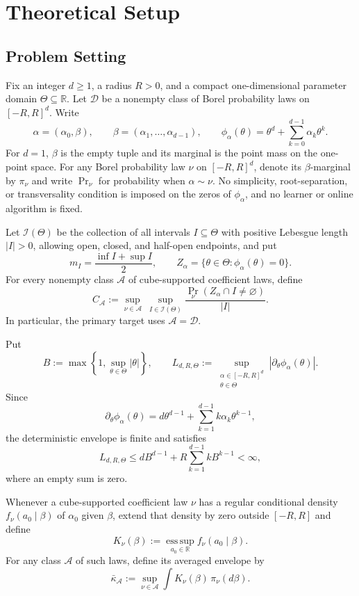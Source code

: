 \section{Theoretical Setup}

\subsection{Problem Setting}

Fix an integer $d\geq 1$, a radius $R>0$, and a compact one-dimensional
parameter domain $\Theta\subseteq\mathbb R$.  Let $\mathcal D$ be a
nonempty class of Borel probability laws on $[-R,R]^d$.  Write
\[
\alpha=(\alpha_0,\beta),\qquad
\beta=(\alpha_1,\ldots,\alpha_{d-1}),\qquad
\phi_\alpha(\theta)=\theta^d+\sum_{k=0}^{d-1}\alpha_k\theta^k.
\]
For $d=1$, $\beta$ is the empty tuple and its marginal is the point mass
on the one-point space.  For any Borel probability law $\nu$ on
$[-R,R]^d$, denote its $\beta$-marginal by $\pi_\nu$ and write
$\Pr_\nu$ for probability when $\alpha\sim\nu$.  No simplicity,
root-separation, or transversality condition is imposed on the zeros of
$\phi_\alpha$, and no learner or online algorithm is fixed.

Let $\mathscr I(\Theta)$ be the collection of all intervals
$I\subseteq\Theta$ with positive Lebesgue length $|I|>0$, allowing open,
closed, and half-open endpoints, and put
\[
m_I=\frac{\inf I+\sup I}{2},
\qquad
Z_\alpha=\{\theta\in\Theta:\phi_\alpha(\theta)=0\}.
\]
For every nonempty class $\mathcal A$ of cube-supported coefficient laws,
define
\[
C_{\mathcal A}
:=\sup_{\nu\in\mathcal A}\ \sup_{I\in\mathscr I(\Theta)}
\frac{\Pr_\nu(Z_\alpha\cap I\neq\varnothing)}{|I|}.
\]
In particular, the primary target uses $\mathcal A=\mathcal D$.

Put
\[
B:=\max\left\{1,\sup_{\theta\in\Theta}|\theta|\right\},
\qquad
L_{d,R,\Theta}
:=\sup_{\substack{\alpha\in[-R,R]^d\\ \theta\in\Theta}}
|\partial_\theta\phi_\alpha(\theta)|.
\]
Since
\[
\partial_\theta\phi_\alpha(\theta)
=d\theta^{d-1}+\sum_{k=1}^{d-1}k\alpha_k\theta^{k-1},
\]
the deterministic envelope is finite and satisfies
\[
L_{d,R,\Theta}
\leq dB^{d-1}+R\sum_{k=1}^{d-1}kB^{k-1}<\infty,
\]
where an empty sum is zero.

Whenever a cube-supported coefficient law $\nu$ has a regular conditional
density $f_\nu(a_0\mid\beta)$ of $\alpha_0$ given $\beta$, extend that
density by zero outside $[-R,R]$ and define
\[
K_\nu(\beta)
:=\operatorname*{ess\,sup}_{a_0\in\mathbb R}
f_\nu(a_0\mid\beta).
\]
For any class $\mathcal A$ of such laws, define its averaged envelope by
\[
\bar\kappa_{\mathcal A}
:=\sup_{\nu\in\mathcal A}
\int K_\nu(\beta)\,\pi_\nu(d\beta).
\]

